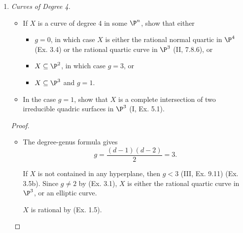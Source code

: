 \documentclass[a4paper]{article}
\begin{document}
\begin{enumerate} [label=\textbf{\arabic*.}, leftmargin=0em]
  \item[\textbf{6.}] \textit{Curves of Degree 4.}
        \begin{itemize}
          \item[(a)] If $X$ is a curve of degree 4 in some $\P^n$, show that either
                \begin{itemize}
                  \item[(1)] $g = 0$, in which case $X$ is either the rational normal quartic in $\P^4$ (Ex. 3.4) or the rational quartic curve in $\P^3$ (II, 7.8.6), or
                  \item[(2)] $X \subseteq \P^2$, in which case $g = 3$, or
                  \item[(3)] $X \subseteq \P^3$ and $g = 1$.
                \end{itemize}
          \item[(b)] In the case $g = 1$, show that $X$ is a complete intersection of two irreducible quadric surfaces in $\P^3$ (I, Ex. 5.1).
        \end{itemize}

        \begin{proof} $ $ \vspace{0pt}
          \begin{itemize} [leftmargin=0cm]
            \item[(a)]  The degree-genus formula gives
                  \begin{equation*}
                    g = \frac{(d - 1)(d - 2)}{2} = 3.
                  \end{equation*}

                   If $X$ is not contained in any hyperplane, then $g < 3$ (III, Ex. 9.11) (Ex. 3.5b).
                  Since $g \neq 2$ by (Ex. 3.1), $X$ is either the rational quartic curve in $\P^3$, or an elliptic curve.

                   $X$ is rational by (Ex. 1.5).


\end{itemize}
\end{proof}
\end{enumerate}
\end{document}
